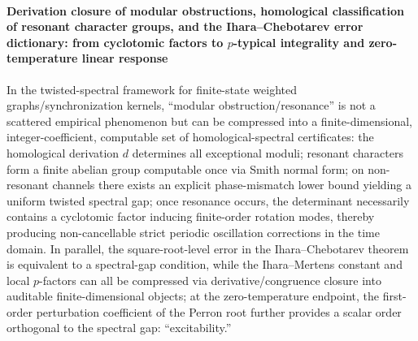 \paragraph{Derivation closure of modular obstructions, homological classification of resonant character groups, and the Ihara--Chebotarev error dictionary: from cyclotomic factors to \texorpdfstring{$p$}{p}-typical integrality and zero-temperature linear response}
In the twisted-spectral framework for finite-state weighted graphs/synchronization kernels, ``modular obstruction/resonance'' is not a scattered empirical phenomenon but can be compressed into a finite-dimensional, integer-coefficient, computable set of homological-spectral certificates: the homological derivation \(d\) determines all exceptional moduli; resonant characters form a finite abelian group computable once via Smith normal form; on non-resonant channels there exists an explicit phase-mismatch lower bound yielding a uniform twisted spectral gap; once resonance occurs, the determinant necessarily contains a cyclotomic factor inducing finite-order rotation modes, thereby producing non-cancellable strict periodic oscillation corrections in the time domain.
In parallel, the square-root-level error in the Ihara--Chebotarev theorem is equivalent to a spectral-gap condition, while the Ihara--Mertens constant and local \(p\)-factors can all be compressed via derivative/congruence closure into auditable finite-dimensional objects; at the zero-temperature endpoint, the first-order perturbation coefficient of the Perron root further provides a scalar order orthogonal to the spectral gap: ``excitability.''
